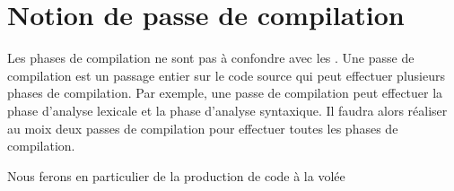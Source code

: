 \section{Notion de passe de compilation}

Les phases de compilation ne sont pas à confondre avec les . Une passe de compilation est un passage entier sur le code source qui peut effectuer plusieurs phases de compilation. Par exemple, une passe de compilation peut effectuer la phase d'analyse lexicale et la phase d'analyse syntaxique. Il faudra alors réaliser au moix deux passes de compilation pour effectuer toutes les phases de compilation.\\ \par

Nous ferons en particulier de la production de code à la volée

